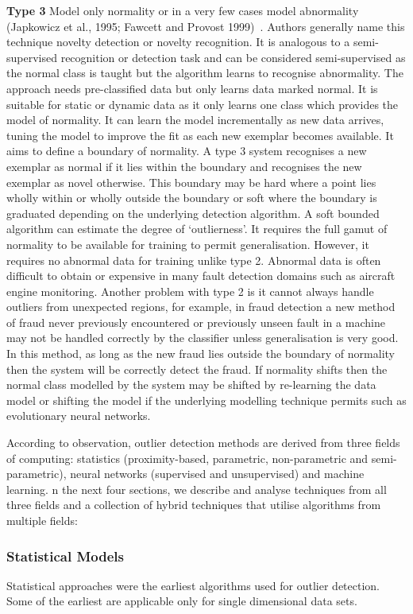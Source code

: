 \textbf{Type 3} Model only normality or in a very few cases model abnormality (Japkowicz et al., 1995; Fawcett and Provost 1999)~\cite{ref_e1}. Authors generally name this technique novelty detection or novelty recognition. It is analogous to a semi-supervised recognition or detection task and can be considered semi-supervised as the normal class is taught but the algorithm learns to recognise abnormality. The approach needs pre-classified data but only learns data marked normal. It is suitable for static or dynamic data as it only learns one class which provides the model of normality. It can learn the model incrementally as new data arrives, tuning the model to improve the fit as each new exemplar becomes available. It aims to define a boundary of normality.
A type 3 system recognises a new exemplar as normal if it lies within the boundary and recognises the new exemplar as novel otherwise. This boundary may be hard where a point lies wholly within or wholly outside the boundary or soft where the boundary is graduated depending on the underlying detection algorithm. A soft bounded algorithm can estimate the degree of ‘outlierness’.
It requires the full gamut of normality to be available for training to permit generalisation. However, it requires no abnormal data for training unlike type 2. Abnormal data is often difficult to obtain or expensive in many fault detection domains such as aircraft engine monitoring. Another problem with type 2 is it cannot always handle outliers from unexpected regions, for example, in fraud detection a new method of fraud never previously encountered or previously unseen fault in a machine may not be handled correctly by the classifier unless generalisation is very good. In this method, as long as the new fraud lies outside the boundary of normality then the system will be correctly detect the fraud. If normality shifts then the normal class modelled by the system may be shifted by re-learning the data model or shifting the model if the underlying modelling technique permits such as evolutionary neural networks.

According to observation, outlier detection methods are derived from three fields of computing: statistics (proximity-based, parametric, non-parametric and semi-parametric), neural networks (supervised and unsupervised) and machine learning. n the next four sections, we describe and analyse techniques from all three fields and a collection of hybrid techniques that utilise algorithms from multiple fields:

\subsubsection{Statistical Models}
Statistical approaches were the earliest algorithms used for outlier detection. Some of the earliest are applicable only for single dimensional data sets. 

